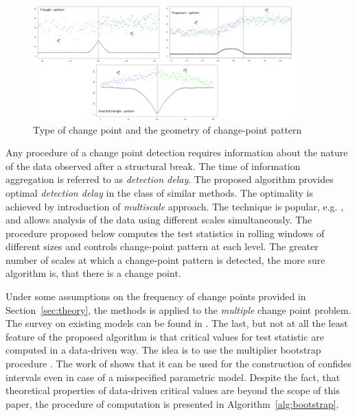 \begin{figure}[!h]
    \centering
    \includegraphics[width=0.9\textwidth, height=0.45\textwidth]{images/patterns-3.png}
    \caption{Type of change point and the geometry of change-point pattern}
    \label{fig:patterns}
\end{figure}

Any procedure of a change point detection requires information about the nature of the data observed after a structural break. The time of information aggregation is referred to as \textit{detection delay}. The proposed algorithm provides optimal \textit{detection delay} in the class of similar methods. The optimality is achieved by introduction of \textit{multiscale} approach. The technique is popular, e.g. \citet{multiscaleCP1}, \citet{SpokoinyCP} and allows analysis of the data using different scales simultaneously. The procedure proposed below computes the test statistics in rolling windows of different sizes and controls change-point pattern at each level. The greater number of scales at which a change-point pattern is detected, the more sure algorithm is, that there is a change point. 

Under some assumptions on the frequency of change points provided in Section~\ref{sec:theory}, the methods is applied to the \textit{multiple} change point problem. The survey on existing models can be found in \citet{chib98estimation}.
The last, but not at all the least feature of the proposed algorithm is that critical values for test statistic are computed in a data-driven way. The idea is to use the multiplier bootstrap procedure \citet{ChernozukovBoot}. The work of \citet{SpokoinyBoot}shows that it can be used for the construction of confides intervals even in case of a misspecified parametric model. Despite the fact, that theoretical properties of data-driven critical values are beyond the scope of this paper, the procedure of computation is presented in Algorithm~\ref{alg:bootstrap}.

